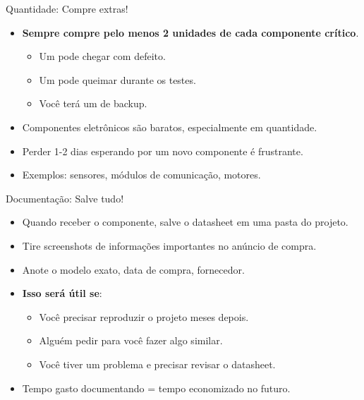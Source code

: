 \documentclass[10pt]{beamer}
\begin{document}
\begin{frame}{Quantidade: Compre extras!}
  \begin{itemize}
    \item \textbf{Sempre compre pelo menos 2 unidades de cada componente crítico}.
    \begin{itemize}
      \item Um pode chegar com defeito.
      \item Um pode queimar durante os testes.
      \item Você terá um de backup.
    \end{itemize}
    \item Componentes eletrônicos são baratos, especialmente em quantidade.
    \item Perder 1-2 dias esperando por um novo componente é frustrante.
    \item Exemplos: sensores, módulos de comunicação, motores.
  \end{itemize}
\end{frame}

\begin{frame}{Documentação: Salve tudo!}
  \begin{itemize}
    \item Quando receber o componente, salve o datasheet em uma pasta do projeto.
    \item Tire screenshots de informações importantes no anúncio de compra.
    \item Anote o modelo exato, data de compra, fornecedor.
    \item \textbf{Isso será útil se}:
    \begin{itemize}
      \item Você precisar reproduzir o projeto meses depois.
      \item Alguém pedir para você fazer algo similar.
      \item Você tiver um problema e precisar revisar o datasheet.
    \end{itemize}
    \item Tempo gasto documentando = tempo economizado no futuro.
  \end{itemize}
\end{frame}
\end{document}
